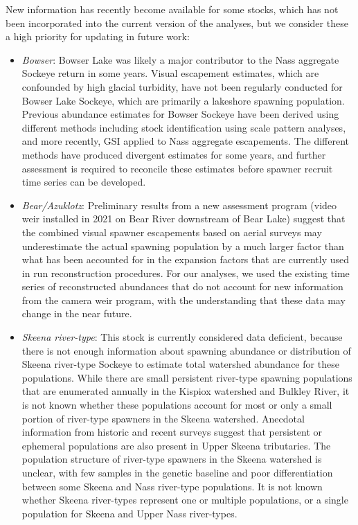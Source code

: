 \documentclass[french,11pt]{book}
\begin{document}
New information has recently become available for some stocks, which has not been incorporated into the current version of the analyses, but we consider these a high priority for updating in future work:
\begin{itemize}

\item
  \emph{Bowser}: Bowser Lake was likely a major contributor to the Nass aggregate Sockeye return in some years. Visual escapement estimates, which are confounded by high glacial turbidity, have not been regularly conducted for Bowser Lake Sockeye, which are primarily a lakeshore spawning population. Previous abundance estimates for Bowser Sockeye have been derived using different methods including stock identification using scale pattern analyses, and more recently, GSI applied to Nass aggregate escapements. The different methods have produced divergent estimates for some years, and further assessment is required to reconcile these estimates before spawner recruit time series can be developed.
\item
  \emph{Bear/Azuklotz}: Preliminary results from a new assessment program (video weir installed in 2021 on Bear River downstream of Bear Lake) suggest that the combined visual spawner escapements based on aerial surveys may underestimate the actual spawning population by a much larger factor than what has been accounted for in the expansion factors that are currently used in run reconstruction procedures. For our analyses, we used the existing time series of reconstructed abundances that do not account for new information from the camera weir program, with the understanding that these data may change in the near future.
\item
  \emph{Skeena river-type}: This stock is currently considered data deficient, because there is not enough information about spawning abundance or distribution of Skeena river-type Sockeye to estimate total watershed abundance for these populations. While there are small persistent river-type spawning populations that are enumerated annually in the Kispiox watershed and Bulkley River, it is not known whether these populations account for most or only a small portion of river-type spawners in the Skeena watershed. Anecdotal information from historic and recent surveys suggest that persistent or ephemeral populations are also present in Upper Skeena tributaries. The population structure of river-type spawners in the Skeena watershed is unclear, with few samples in the genetic baseline and poor differentiation between some Skeena and Nass river-type populations. It is not known whether Skeena river-types represent one or multiple populations, or a single population for Skeena and Upper Nass river-types.
\end{itemize}
\clearpage
\end{document}

